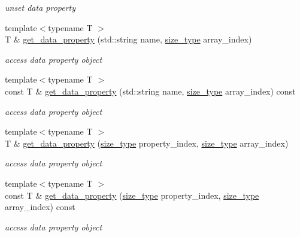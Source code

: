 \begin{DoxyCompactItemize}
\begin{DoxyCompactList}\small\item\em unset data property \end{DoxyCompactList}\item 
{\footnotesize template$<$typename T $>$ }\\\-T \& \hyperlink{classlb_1_1property__array_ab25f1a5a52a03b6490baf04c2fa69244}{get\-\_\-data\-\_\-property} (std\-::string name, \hyperlink{classlb_1_1property__array_a76d861a6fb4b99128f627ad951918429}{size\-\_\-type} array\-\_\-index)
\begin{DoxyCompactList}\small\item\em access data property object \end{DoxyCompactList}\item 
{\footnotesize template$<$typename T $>$ }\\const \-T \& \hyperlink{classlb_1_1property__array_a5f4452f16fbb5be6d9bc676e6048b361}{get\-\_\-data\-\_\-property} (std\-::string name, \hyperlink{classlb_1_1property__array_a76d861a6fb4b99128f627ad951918429}{size\-\_\-type} array\-\_\-index) const 
\begin{DoxyCompactList}\small\item\em access data property object \end{DoxyCompactList}\item 
{\footnotesize template$<$typename T $>$ }\\\-T \& \hyperlink{classlb_1_1property__array_a8e3b88e699b568f88c147ce11e9cd95a}{get\-\_\-data\-\_\-property} (\hyperlink{classlb_1_1property__array_a76d861a6fb4b99128f627ad951918429}{size\-\_\-type} property\-\_\-index, \hyperlink{classlb_1_1property__array_a76d861a6fb4b99128f627ad951918429}{size\-\_\-type} array\-\_\-index)
\begin{DoxyCompactList}\small\item\em access data property object \end{DoxyCompactList}\item 
{\footnotesize template$<$typename T $>$ }\\const \-T \& \hyperlink{classlb_1_1property__array_aa703f2d13757714c2309f80a6526dbc7}{get\-\_\-data\-\_\-property} (\hyperlink{classlb_1_1property__array_a76d861a6fb4b99128f627ad951918429}{size\-\_\-type} property\-\_\-index, \hyperlink{classlb_1_1property__array_a76d861a6fb4b99128f627ad951918429}{size\-\_\-type} array\-\_\-index) const 
\begin{DoxyCompactList}\small\item\em access data property object \end{DoxyCompactList}\item 

\end{DoxyCompactItemize}
